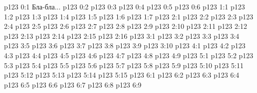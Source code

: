 \author{Промежуточные создания}
\vs p123 0:1  Бла-бла...
\vs p123 0:2 \pc 
\vs p123 0:3 
\vs p123 0:4 \pc 
\vs p123 0:5 
\vs p123 0:6 
\vs p123 1:1 
\vs p123 1:2 
\vs p123 1:3 
\vs p123 1:4 
\vs p123 1:5 
\vs p123 1:6 
\vs p123 1:7 
\vs p123 2:1 
\vs p123 2:2 
\vs p123 2:3 \pc 
\vs p123 2:4 
\vs p123 2:5 
\vs p123 2:6 
\vs p123 2:7 
\vs p123 2:8 
\vs p123 2:9 
\vs p123 2:10 
\vs p123 2:11 
\vs p123 2:12 
\vs p123 2:13 \pc 
\vs p123 2:14 
\vs p123 2:15 
\vs p123 2:16 
\vs p123 3:1 
\vs p123 3:2 \pc 
\vs p123 3:3 
\vs p123 3:4 \pc 
\vs p123 3:5 \pc 
\vs p123 3:6 \pc 
\vs p123 3:7 
\vs p123 3:8 
\vs p123 3:9 \pc 
\vs p123 3:10 \pc 
{}
\vs p123 4:1 
\vs p123 4:2 
\vs p123 4:3 
\vs p123 4:4 
\vs p123 4:5 \pc 
\vs p123 4:6 
\vs p123 4:7 
\vs p123 4:8 
\vs p123 4:9 \pc 
{}
\vs p123 5:1 
\vs p123 5:2 
\vs p123 5:3 \pc 
\vs p123 5:4 
\vs p123 5:5 
\vs p123 5:6 \pc 
\vs p123 5:7 
\vs p123 5:8 
\vs p123 5:9 \pc 
\vs p123 5:10 
\vs p123 5:11 
\vs p123 5:12 \pc 
\vs p123 5:13 
\vs p123 5:14 
\vs p123 5:15 \pc 
{}
\vs p123 6:1 
\vs p123 6:2 
\vs p123 6:3 
\vs p123 6:4 
\vs p123 6:5 
\vs p123 6:6 
\vs p123 6:7 \pc 
\vs p123 6:8 \pc 
\vs p123 6:9 
\quizlink
